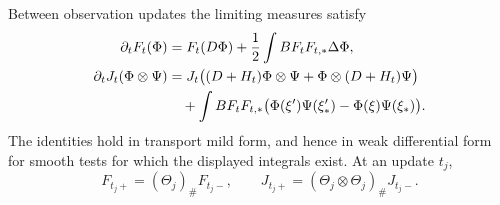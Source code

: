\begin{proposition}
\label{prop:tree-evolution}
Between observation updates the limiting measures satisfy
\begin{align}
 \partial_tF_t(\Phi)
  &=F_t(D\Phi)+\frac12\int BF_tF_{t,*}\Delta\Phi,
       \label{eq:limit-F-evolution}\\
 \partial_tJ_t(\Phi\otimes\Psi)
  &=J_t\bigl((D+H_t)\Phi\otimes\Psi
                     +\Phi\otimes(D+H_t)\Psi\bigr)\notag\\
  &\quad+\int BF_tF_{t,*}
          \bigl(\Phi(\xi')\Psi(\xi_*')
                         -\Phi(\xi)\Psi(\xi_*)\bigr).
       \label{eq:limit-J-evolution}
\end{align}
The identities hold in transport mild form, and hence in weak
differential form for smooth tests for which the displayed integrals
exist.  At an update \(t_j\),
\begin{equation}\label{eq:limit-pushforwards}
       F_{t_j+}=(\Theta_j)_\#F_{t_j-},
       \qquad
       J_{t_j+}=(\Theta_j\otimes\Theta_j)_\#J_{t_j-}.
\end{equation}
\end{proposition}


